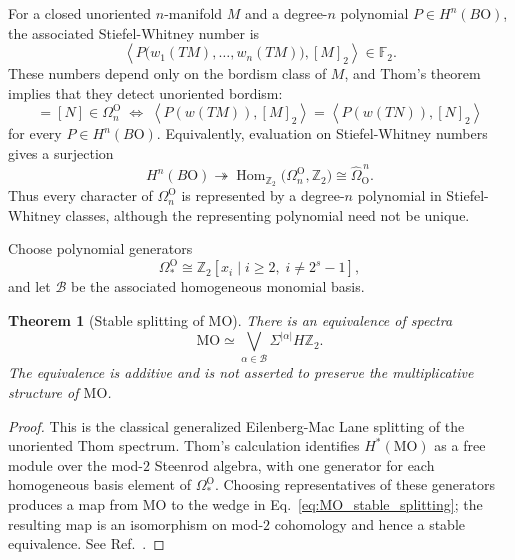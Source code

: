 \documentclass[aps,prx,reprint,superscriptaddress,twocolumn,amsmath,amssymb,amsfonts, nofootinbib]{revtex4-2}
\theoremstyle{apsstyle}
\newtheorem{theorem}{Theorem}[section]
\begin{document}
\bigskip 

\noindent For a closed unoriented $n$-manifold $M$ and a degree-$n$ polynomial $P\in H^n(B\mathrm O)$, the associated Stiefel-Whitney number is
\begin{equation}
    \left\langle
        P\bigl(w_1(TM),\ldots,w_n(TM)\bigr), [M]_2
    \right\rangle \in\mathbb F_2.
    \label{eq:Stiefel_Whitney_number}
\end{equation}
These numbers depend only on the bordism class of $M$, and Thom's theorem implies that they detect unoriented bordism:
\begin{equation}
    [M]=[N]\in\Omega_n^{\mathrm O} \;\Longleftrightarrow\;
    \left\langle P(w(TM)),[M]_2\right\rangle
    = \left\langle P(w(TN)),[N]_2\right\rangle
\end{equation}
for every $P\in H^n(B\mathrm O)$. Equivalently, evaluation on Stiefel-Whitney numbers gives a surjection
\begin{equation}
    H^n(B\mathrm O) \twoheadrightarrow
    \operatorname{Hom}_{\mathbb Z_2}
    \bigl(\Omega_n^{\mathrm O},\mathbb Z_2\bigr)
    \cong
    \widehat{\Omega}_{\mathrm O}^{\,n}.
    \label{eq:SW_polynomials_surject_characters}
\end{equation}
Thus every character of $\Omega_n^{\mathrm O}$ is represented by a degree-$n$ polynomial in Stiefel-Whitney classes, although the representing polynomial need not be unique.

\bigskip 

Choose polynomial generators
\begin{equation*}
    \Omega_*^{\mathrm O} \cong \mathbb Z_2[x_i\mid i\geq2,\;i\neq2^s-1],
\end{equation*}
and let $\mathcal B$ be the associated homogeneous monomial basis.

\begin{theorem}[Stable splitting of $\mathrm{MO}$]
\label{thm:MO_stable_splitting}
There is an equivalence of spectra
\begin{equation}
    \mathrm{MO} \simeq \bigvee_{\alpha\in\mathcal B}
    \Sigma^{|\alpha|}H\mathbb Z_2.
    \label{eq:MO_stable_splitting}
\end{equation}
The equivalence is additive and is not asserted to preserve the multiplicative structure of $\mathrm{MO}$.
\end{theorem}

\begin{proof}
This is the classical generalized Eilenberg-Mac Lane splitting of the unoriented Thom spectrum. Thom's calculation identifies $H^*(\mathrm{MO})$ as a free module over the mod-$2$ Steenrod algebra, with one generator for each homogeneous basis element of $\Omega_*^{\mathrm O}$. Choosing representatives of these generators produces a map from $\mathrm{MO}$ to the wedge in Eq.~\eqref{eq:MO_stable_splitting}; the resulting map is an isomorphism on mod-$2$ cohomology and hence a stable equivalence. See Ref.~\cite[Ch.~25, Sec.~6]{JPMay}.
\end{proof}
\end{document}
